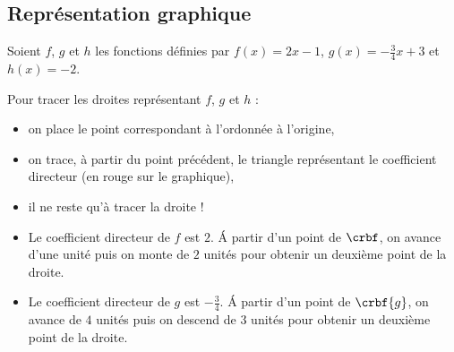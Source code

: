 \subsection{Représentation graphique}
%
%
\begin{exr}
Soient $f$, $g$ et $h$ les fonctions définies par  $f(x)=2x-1$, $g(x)=-\frac34x+3$ et $h(x) = -2$.

Pour tracer les droites représentant $f$, $g$ et $h$ :
    \begin{itemize}
    \item on place le point correspondant à l'ordonnée à l'origine,
    \item on trace, à partir du point précédent, le triangle  représentant le coefficient directeur (en rouge sur le graphique),
    \item il ne reste qu'à tracer la droite !
    \end{itemize}
    
    \begin{rmq}
        \begin{itemize}
        \item Le coefficient directeur de $f$ est $2$. \'A partir d'un point de $\crbf$, on avance d'une unité puis on monte de $2$ unités pour obtenir un deuxième point de la droite.
        \item Le coefficient directeur de $g$ est $-\frac34$. \'A partir d'un point de $\crbf{g}$, on avance de $4$ unités puis on descend de $3$ unités pour obtenir un deuxième point de la droite.
        \end{itemize}
    \end{rmq}
\end{exr}
